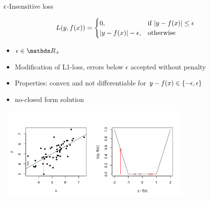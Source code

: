 \begin{vbframe}{$\epsilon$-Insensitive loss}

\vspace*{-0.3cm}
$$
L(y, f(x)) =  \begin{cases}
  0,  & \text{if } |y - f(x)| \le \epsilon \\
  |y - f(x)|-\epsilon, & \text{otherwise }
  \end{cases}
$$
\vspace*{-0.3cm}
\begin{itemize}
\item $ \epsilon \in \R_{+}$
\item Modification of L1-loss, errors below $\epsilon$ accepted without penalty
\item Properties: convex and not differentiable for $ y - f(x) \in \{-\epsilon, \epsilon\}$
\item no-closed form solution
\end{itemize}

\vspace*{-1.1cm}

\begin{center}
\includegraphics[width = 10cm, height = 4.7cm]{figure_man/2_6_loss_epsilon_plot1.png} \\
\end{center}

\end{vbframe}


